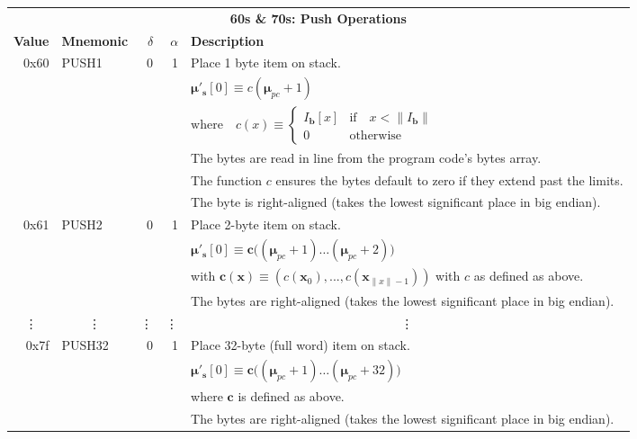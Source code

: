 \documentclass[9pt,oneside]{amsart}
\begin{document}
\begin{tabular*}{\columnwidth}[h]{rlrrl}
\toprule
\multicolumn{5}{c}{\textbf{60s \& 70s: Push Operations}} \vspace{5pt} \\
\textbf{Value} & \textbf{Mnemonic} & $\delta$ & $\alpha$ & \textbf{Description} \vspace{5pt} \\
0x60 & {\small PUSH1} & 0 & 1 & Place 1 byte item on stack. \\
&&&& $\boldsymbol{\mu}'_{\mathbf{s}}[0] \equiv c(\boldsymbol{\mu}_{pc} + 1)$ \\
&&&& $\text{where} \quad c(x) \equiv \begin{cases} I_{\mathbf{b}}[x] & \text{if} \quad x < \lVert I_{\mathbf{b}} \rVert \\ 0 & \text{otherwise} \end{cases}$ \\
&&&& The bytes are read in line from the program code's bytes array. \\
&&&& The function $c$ ensures the bytes default to zero if they extend past the limits.\\
&&&& The byte is right-aligned (takes the lowest significant place in big endian). \\
\midrule
0x61 & {\small PUSH2} & 0 & 1 & Place 2-byte item on stack. \\
&&&& $\boldsymbol{\mu}'_{\mathbf{s}}[0] \equiv \boldsymbol{c}\big( (\boldsymbol{\mu}_{pc} + 1) \dots (\boldsymbol{\mu}_{pc} + 2) \big)$ \\
&&&& with $\boldsymbol{c}(\boldsymbol{x}) \equiv (c(\boldsymbol{x}_0), ..., c(\boldsymbol{x}_{\lVert x \rVert -1})) $ with $c$ as defined as above. \\
&&&& The bytes are right-aligned (takes the lowest significant place in big endian). \\
\midrule
\multicolumn{1}{c}{\vdots} & \multicolumn{1}{c}{\vdots} & \vdots & \vdots & \multicolumn{1}{c}{\vdots} \\
\midrule
0x7f & {\small PUSH32} & 0 & 1 & Place 32-byte (full word) item on stack. \\
&&&& $\boldsymbol{\mu}'_{\mathbf{s}}[0] \equiv \boldsymbol{c}\big((\boldsymbol{\mu}_{pc} + 1) \dots (\boldsymbol{\mu}_{pc} + 32) \big)$ \\
&&&& where $\boldsymbol{c}$ is defined as above. \\
&&&& The bytes are right-aligned (takes the lowest significant place in big endian). \\
\bottomrule
\end{tabular*}
\end{document}
